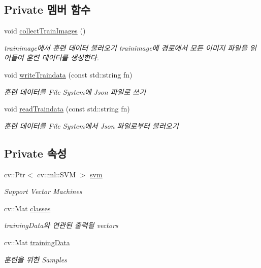 \subsection*{Private 멤버 함수}
\begin{DoxyCompactItemize}
\item 
\mbox{\label{class_svm_a1b18e97fffb268f9cfe91152f7e96298}} 
void \hyperlink{class_svm_a1b18e97fffb268f9cfe91152f7e96298}{collect\+Train\+Images} ()
\begin{DoxyCompactList}\small\item\em trainimage에서 훈련 데이터 불러오기 \textquotesingle{}trainimage\textquotesingle{}에 경로에서 모든 이미지 파일을 읽어들여 훈련 데이터를 생성한다. \end{DoxyCompactList}\item 
void \hyperlink{class_svm_a303d7fad50a71154c8201883db777ca1}{write\+Traindata} (const std\+::string fn)
\begin{DoxyCompactList}\small\item\em 훈련 데이터를 File System에 Json 파일로 쓰기 \end{DoxyCompactList}\item 
void \hyperlink{class_svm_afb95b76fa494604abcd022c5948fb728}{read\+Traindata} (const std\+::string fn)
\begin{DoxyCompactList}\small\item\em 훈련 데이터를 File System에서 Json 파일로부터 불러오기 \end{DoxyCompactList}\end{DoxyCompactItemize}
\subsection*{Private 속성}
\begin{DoxyCompactItemize}
\item 
\mbox{\label{class_svm_ac4e8ba994bfa1f66d17ef3b0fa2d856c}} 
cv\+::\+Ptr$<$ cv\+::ml\+::\+S\+VM $>$ \hyperlink{class_svm_ac4e8ba994bfa1f66d17ef3b0fa2d856c}{svm}
\begin{DoxyCompactList}\small\item\em Support Vector Machines \end{DoxyCompactList}\item 
\mbox{\label{class_svm_a76663f6a5d1baa4185887451aed8e577}} 
cv\+::\+Mat \hyperlink{class_svm_a76663f6a5d1baa4185887451aed8e577}{classes}
\begin{DoxyCompactList}\small\item\em training\+Data와 연관된 출력될 vectors \end{DoxyCompactList}\item 
\mbox{\label{class_svm_a29ecb047ff1b1dc376b60e9e4bf11b37}} 
cv\+::\+Mat \hyperlink{class_svm_a29ecb047ff1b1dc376b60e9e4bf11b37}{training\+Data}
\begin{DoxyCompactList}\small\item\em 훈련을 위한 Samples \end{DoxyCompactList}\end{DoxyCompactItemize}


